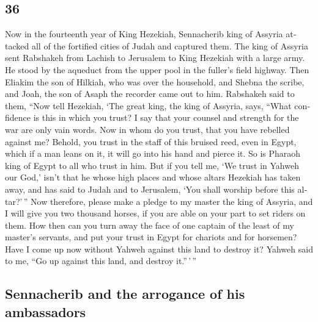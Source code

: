 \begin{paracol}{2}
\begin{otherlanguage}{english}
\hypertarget{section-71}{%
\section{36}\label{section-71}}

 Now in the fourteenth year of King Hezekiah, Sennacherib
king of Assyria attacked all of the fortified cities of Judah and
captured them.  The king of Assyria sent Rabshakeh from
Lachish to Jerusalem to King Hezekiah with a large army. He stood by the
aqueduct from the upper pool in the fuller's field highway.
 Then Eliakim the son of Hilkiah, who was over the
household, and Shebna the scribe, and Joah, the son of Asaph the
recorder came out to him.  Rabshakeh said to them, ``Now
tell Hezekiah, `The great king, the king of Assyria, says, ``What
confidence is this in which you trust?  I say that your
counsel and strength for the war are only vain words. Now in whom do you
trust, that you have rebelled against me?  Behold, you
trust in the staff of this bruised reed, even in Egypt, which if a man
leans on it, it will go into his hand and pierce it. So is Pharaoh king
of Egypt to all who trust in him.  But if you tell me, `We
trust in Yahweh our God,' isn't that he whose high places and whose
altars Hezekiah has taken away, and has said to Judah and to Jerusalem,
`You shall worship before this altar?'\,''  Now therefore,
please make a pledge to my master the king of Assyria, and I will give
you two thousand horses, if you are able on your part to set riders on
them.  How then can you turn away the face of one captain
of the least of my master's servants, and put your trust in Egypt for
chariots and for horsemen?  Have I come up now without
Yahweh against this land to destroy it? Yahweh said to me, ``Go up
against this land, and destroy it.''\,'\,''

\hypertarget{sennacherib-and-the-arrogance-of-his-ambassadors}{%
\subsection{Sennacherib and the arrogance of his
ambassadors}\label{sennacherib-and-the-arrogance-of-his-ambassadors}}


\end{otherlanguage}
\end{paracol}
